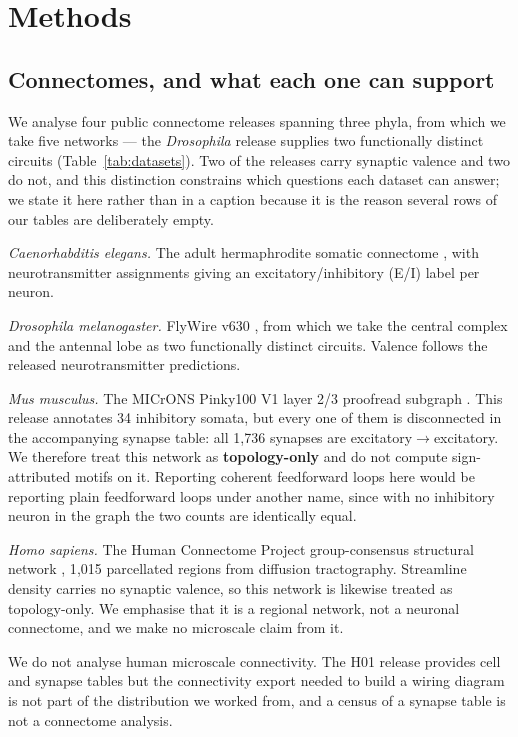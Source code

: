 \section{Methods}

\subsection{Connectomes, and what each one can support}
\label{sec:data}

We analyse four public connectome releases spanning three phyla, from which we take
five networks --- the \textit{Drosophila} release supplies two functionally distinct
circuits (Table~\ref{tab:datasets}). Two of the releases carry synaptic valence and two
do not, and this distinction constrains which questions each dataset can answer; we
state it here rather than in a caption because it is the reason several rows of our
tables are deliberately empty.

\textit{Caenorhabditis elegans.} The adult hermaphrodite somatic connectome
\cite{cook2019whole,varshney2011structural}, with neurotransmitter assignments
giving an excitatory/inhibitory (E/I) label per neuron.

\textit{Drosophila melanogaster.} FlyWire v630 \cite{dorkenwald2024neuronal,
lin2024network}, from which we take the central complex and the antennal lobe as
two functionally distinct circuits. Valence follows the released neurotransmitter
predictions.

\textit{Mus musculus.} The MICrONS Pinky100 V1 layer 2/3 proofread subgraph
\cite{microns2025functional}. This release annotates 34 inhibitory somata, but every
one of them is disconnected in the accompanying synapse table: all 1{,}736 synapses
are excitatory$\rightarrow$excitatory. We therefore treat this network as
\textbf{topology-only} and do not compute sign-attributed motifs on it. Reporting
coherent feedforward loops here would be reporting plain feedforward loops under
another name, since with no inhibitory neuron in the graph the two counts are
identically equal.

\textit{Homo sapiens.} The Human Connectome Project group-consensus structural
network \cite{vanessen2012human}, 1{,}015 parcellated regions from diffusion
tractography. Streamline density carries no synaptic valence, so this network is
likewise treated as topology-only. We emphasise that it is a regional network, not a
neuronal connectome, and we make no microscale claim from it.

We do not analyse human microscale connectivity. The H01 release
\cite{shapsoncoe2024petavoxel} provides cell and synapse tables but the connectivity
export needed to build a wiring diagram is not part of the distribution we worked
from, and a census of a synapse table is not a connectome analysis.

